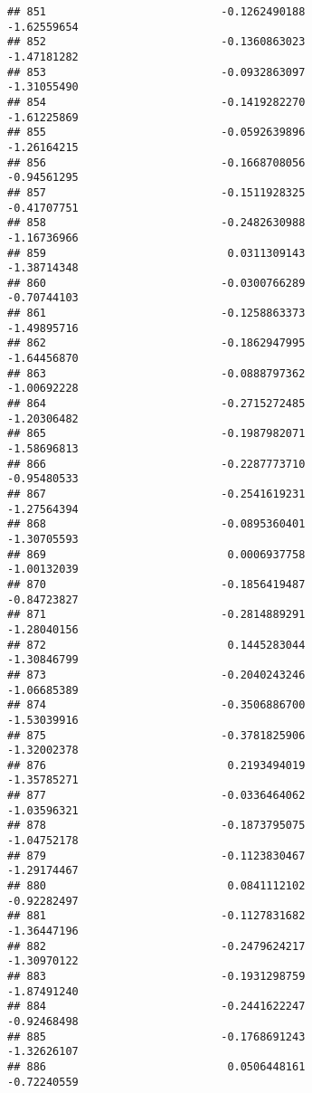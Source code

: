 \documentclass[
]{article}
\begin{document}
\begin{verbatim}
## 851                           -0.1262490188                -1.62559654
## 852                           -0.1360863023                -1.47181282
## 853                           -0.0932863097                -1.31055490
## 854                           -0.1419282270                -1.61225869
## 855                           -0.0592639896                -1.26164215
## 856                           -0.1668708056                -0.94561295
## 857                           -0.1511928325                -0.41707751
## 858                           -0.2482630988                -1.16736966
## 859                            0.0311309143                -1.38714348
## 860                           -0.0300766289                -0.70744103
## 861                           -0.1258863373                -1.49895716
## 862                           -0.1862947995                -1.64456870
## 863                           -0.0888797362                -1.00692228
## 864                           -0.2715272485                -1.20306482
## 865                           -0.1987982071                -1.58696813
## 866                           -0.2287773710                -0.95480533
## 867                           -0.2541619231                -1.27564394
## 868                           -0.0895360401                -1.30705593
## 869                            0.0006937758                -1.00132039
## 870                           -0.1856419487                -0.84723827
## 871                           -0.2814889291                -1.28040156
## 872                            0.1445283044                -1.30846799
## 873                           -0.2040243246                -1.06685389
## 874                           -0.3506886700                -1.53039916
## 875                           -0.3781825906                -1.32002378
## 876                            0.2193494019                -1.35785271
## 877                           -0.0336464062                -1.03596321
## 878                           -0.1873795075                -1.04752178
## 879                           -0.1123830467                -1.29174467
## 880                            0.0841112102                -0.92282497
## 881                           -0.1127831682                -1.36447196
## 882                           -0.2479624217                -1.30970122
## 883                           -0.1931298759                -1.87491240
## 884                           -0.2441622247                -0.92468498
## 885                           -0.1768691243                -1.32626107
## 886                            0.0506448161                -0.72240559

\end{verbatim}
\end{document}
